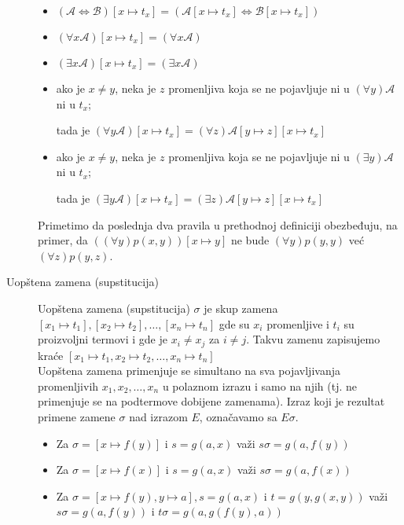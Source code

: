 \documentclass[../main.tex]{subfiles}
\begin{document}
\begin{description}
\begin{itemize}
\item $(\mathcal{A} \Leftrightarrow \mathcal{B})[x\mapsto t_x]=(\mathcal{A}  [x\mapsto t_x] \Leftrightarrow \mathcal{B}[x\mapsto t_x] )$

\item $(\forall x\mathcal{A})[x\mapsto t_x] = (\forall x\mathcal{A})$

\item $(\exists x\mathcal{A})[x\mapsto t_x] = (\exists x\mathcal{A})$

\item ako je $x\neq y$, neka je $z$ promenljiva koja se ne pojavljuje ni u $(\forall y)\mathcal{A}$ ni u $t_x$;  \hfill

tada je $(\forall y\mathcal{A})[x\mapsto t_x] = (\forall z)\mathcal{A}[y\mapsto z][x\mapsto t_x]$

\item ako je $x\neq y$, neka je $z$ promenljiva koja se ne pojavljuje ni u $(\exists y)\mathcal{A}$ ni u $t_x$; \hfill
 
 tada je $(\exists y\mathcal{A})[x\mapsto t_x] = (\exists z)\mathcal{A}[y\mapsto z][x\mapsto t_x]$
\end{itemize}
Primetimo da poslednja dva pravila u prethodnoj definiciji obezbeđuju, na primer, da 
$((\forall y)p(x,y))[x\mapsto y]$ ne bude $(\forall y)p(y,y)$ već $(\forall z)p(y,z)$.

\item[Uopštena zamena (supstitucija)] \hfill

Uopštena zamena (supstitucija) $\sigma$ je skup zamena $[x_1\mapsto t_1], [x_2\mapsto t_2], \ldots, [x_n\mapsto t_n]$ gde su $x_i$ promenljive i $t_i$ su proizvoljni termovi i gde je $x_i\neq x_j$ za $i\neq j$. Takvu zamenu zapisujemo kraće $[x_1\mapsto t_1, x_2\mapsto t_2, \ldots, x_n\mapsto t_n]$
\\
Uopštena zamena primenjuje se simultano na sva pojavljivanja promenljivih $x_1, x_2, \ldots, x_n$ u polaznom izrazu i samo na njih (tj. ne primenjuje se na podtermove dobijene zamenama). Izraz koji je rezultat primene zamene $\sigma$ nad izrazom $E$, označavamo sa $E\sigma$.

\begin{boxprimer}
\begin{itemize}
\item Za $\sigma = [x\mapsto f(y)]$ i $s=g(a,x)$ važi $s\sigma=g(a,f(y))$
\item Za $\sigma = [x\mapsto f(x)]$ i $s=g(a,x)$ važi  $s\sigma=g(a,f(x))$
\item Za $\sigma = [x\mapsto f(y), y\mapsto a], s=g(a,x)$ i $t=g(y,g(x,y))$ važi  $s\sigma=g(a,f(y))$ i $t\sigma=g(a, g(f(y),a) )$
\end{itemize}
\end{boxprimer}


\end{description}
\end{document}
